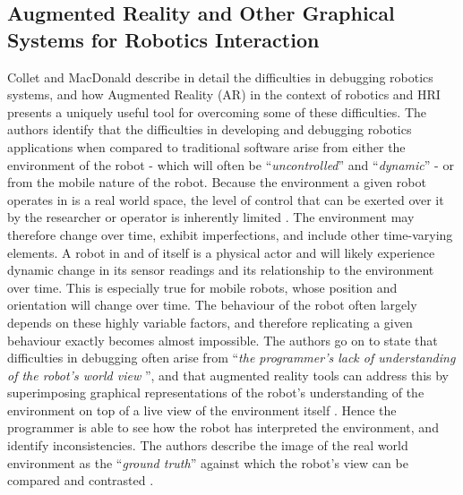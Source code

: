 \documentclass[titlepage,hidelinks,10pt]{article}
\begin{document}
\subsection{Augmented Reality and Other Graphical Systems for Robotics Interaction} \label{VRAndAR}
Collet and MacDonald \cite{AugmentedRealityDebuggingSystem} describe in detail the difficulties in debugging robotics systems, and how Augmented Reality (AR) in the context of robotics and HRI presents a uniquely useful tool for overcoming some of these difficulties. The authors identify that the difficulties in developing and debugging robotics applications when compared to traditional software arise from either the environment of the robot - which will often be ``\textit{uncontrolled}'' and ``\textit{dynamic}'' - or from the mobile nature of the robot. Because the environment a given robot operates in is a real world space, the level of control that can be exerted over it by the researcher or operator is inherently limited \cite{AugmentedRealityDebuggingSystem}. The environment may therefore change over time, exhibit imperfections, and include other time-varying elements. A robot in and of itself is a physical actor and will likely experience dynamic change in its sensor readings and its relationship to the environment over time. This is especially true for mobile robots, whose position and orientation will change over time. The behaviour of the robot often largely depends on these highly variable factors, and therefore replicating a given behaviour exactly becomes almost impossible. The authors go on to state that difficulties in debugging often arise from ``\textit{the programmer's lack of understanding of the robot's world view} \cite{AugmentedRealityDebuggingSystem}'', and that augmented reality tools can address this by superimposing graphical representations of the robot's understanding of the environment on top of a live view of the environment itself \cite{AugmentedRealityDebuggingSystem}. Hence the programmer is able to see how the robot has interpreted the environment, and identify inconsistencies. The authors describe the image of the real world environment as the ``\textit{ground truth}'' against which the robot's view can be compared and contrasted \cite{AugmentedRealityDebuggingSystem}.
\end{document}
